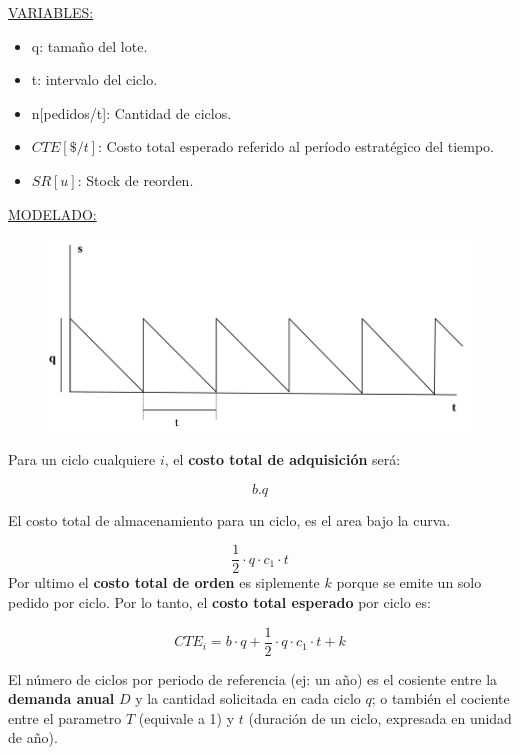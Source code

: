 \documentclass{article}
\begin{document}
\noindent
\underline{VARIABLES:}
\begin{itemize}
    \item q: tamaño del lote.
    \item t: intervalo del ciclo.
    \item n[pedidos/t]: Cantidad de ciclos.
    \item \(CTE[\$/t]\): Costo total esperado referido al período estratégico del tiempo.
    \item \(SR[u]\): Stock de reorden.
\end{itemize}

\noindent
\underline{MODELADO:}

\begin{figure}[h!]
    \includegraphics[width=\linewidth]{imagenes/stock-modelo-basico.png}
\end{figure}

Para un ciclo cualquiere \(i\), el \textbf{costo total de adquisición} será:

\[
    b.q
\]

El costo total de almacenamiento para un ciclo, es el area bajo la curva.

\[
    \frac{1}{2} \cdot q \cdot c_1 \cdot t
\]
Por ultimo el \textbf{costo total de orden} es siplemente \(k\) porque se emite un solo pedido por ciclo. 
Por lo tanto, el \textbf{costo total esperado} por ciclo es:

\begin{equation}
    CTE_i= b \cdot q+\frac{1}{2} \cdot q \cdot c_1 \cdot t + k
\end{equation}

El número de ciclos por periodo de referencia (ej: un año) es el cosiente entre la \textbf{demanda anual} \(D\) 
y la cantidad solicitada en cada ciclo \(q\); o también el cociente entre el parametro \(T\) (equivale a 1) y \(t\)
(duración de un ciclo, expresada en unidad de año).
\end{document}
